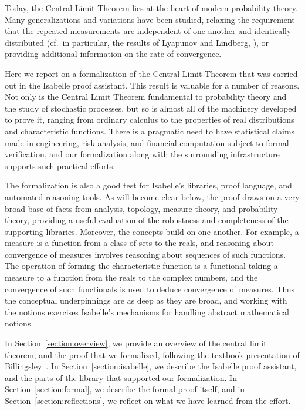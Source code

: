 \documentclass{svjour3}
\begin{document}
Today, the Central Limit Theorem lies at the heart of modern probability theory. Many generalizations and variations have been studied, relaxing the requirement that the repeated measurements are independent of one another and identically distributed (cf.~in particular, the results of Lyapunov and Lindberg, \cite{?}), or providing additional information on the rate of convergence.

Here we report on a formalization of the Central Limit Theorem that was carried out in the Isabelle proof assistant. This result is valuable for a number of reasons. Not only is the Central Limit Theorem fundamental to probability theory and the study of stochastic processes, but so is almost all of the machinery developed to prove it, ranging from ordinary calculus to the properties of real distributions and characteristic functions. There is a pragmatic need to have statistical claims made in engineering, risk analysis, and financial computation subject to formal verification, and our formalization along with the surrounding infrastructure supports such practical efforts.

The formalization is also a good test for Isabelle's libraries, proof language, and automated reasoning tools. As will become clear below, the proof draws on a very broad base of facts from analysis, topology, measure theory, and probability theory, providing a useful evaluation of the robustness and completeness of the supporting libraries. Moreover, the concepts build on one another. For example, a measure is a function from a class of sets to the reals, and reasoning about convergence of measures involves reasoning about sequences of such functions. The operation of forming the characteristic function is a functional taking a measure to a function from the reals to the complex numbers, and the convergence of such functionals is used to deduce convergence of measures. Thus the conceptual underpinnings are as deep as they are broad, and working with the notions exercises Isabelle's mechanisms for handling abstract mathematical notions.

In Section~\ref{section:overview}, we provide an overview of the central limit theorem, and the proof that we formalized, following the textbook presentation of Billingsley~\cite{billingsley:95}. In Section~\ref{section:isabelle}, we describe the Isabelle proof assistant, and the parts of the library that supported our formalization. In Section~\ref{section:formal}, we describe the formal proof itself, and in Section~\ref{section:reflections}, we reflect on what we have learned from the effort. 
\end{document}
